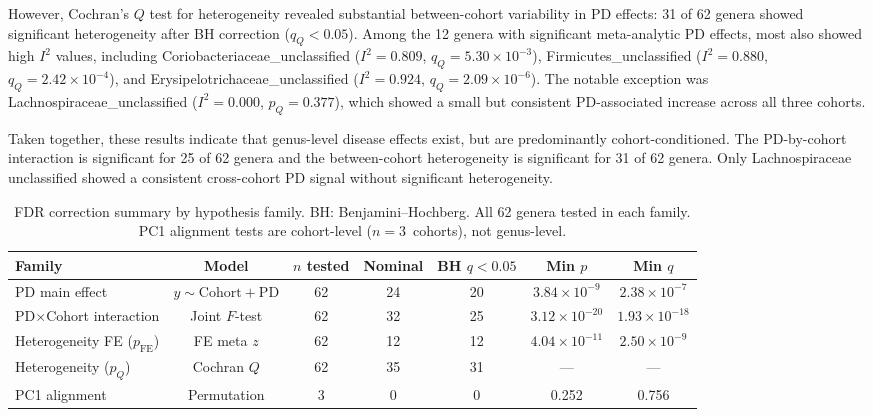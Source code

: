 \documentclass[12pt,a4paper]{article}
\begin{document}
However, Cochran's $Q$ test for heterogeneity revealed substantial
between-cohort variability in PD effects: 31 of 62 genera showed significant
heterogeneity after BH correction ($q_Q < 0.05$). Among the 12 genera with
significant meta-analytic PD effects, most also showed high $I^2$ values,
including Coriobacteriaceae\_unclassified ($I^2 = 0.809$,
$q_Q = 5.30 \times 10^{-3}$), Firmicutes\_unclassified ($I^2 = 0.880$,
$q_Q = 2.42 \times 10^{-4}$), and Erysipelotrichaceae\_unclassified
($I^2 = 0.924$, $q_Q = 2.09 \times 10^{-6}$). The notable exception was
Lachnospiraceae\_unclassified ($I^2 = 0.000$, $p_Q = 0.377$), which
showed a small but consistent PD-associated increase across all three
cohorts.

Taken together, these results indicate that genus-level disease effects
exist, but are predominantly cohort-conditioned. The PD-by-cohort
interaction is significant for 25 of 62 genera and the between-cohort
heterogeneity is significant for 31 of 62 genera. Only Lachnospiraceae
unclassified showed a consistent cross-cohort PD signal without significant
heterogeneity.

\begin{table}[h]
\centering
\caption{FDR correction summary by hypothesis family. BH: Benjamini--Hochberg.
All 62 genera tested in each family. PC1 alignment tests are cohort-level
($n = 3$~cohorts), not genus-level.}
\label{tab:fdr-summary}
\begin{tabular}{lcccccc}
\toprule
Family & Model & $n$ tested & Nominal & BH $q<0.05$ &
Min $p$ & Min $q$ \\
\midrule
PD main effect & $y \sim \mathrm{Cohort}+\mathrm{PD}$ &
  62 & 24 & 20 & $3.84\times10^{-9}$ & $2.38\times10^{-7}$ \\
PD$\times$Cohort interaction & Joint $F$-test &
  62 & 32 & 25 & $3.12\times10^{-20}$ & $1.93\times10^{-18}$ \\
Heterogeneity FE ($p_{\mathrm{FE}}$) & FE meta $z$ &
  62 & 12 & 12 & $4.04\times10^{-11}$ & $2.50\times10^{-9}$ \\
Heterogeneity ($p_Q$) & Cochran $Q$ &
  62 & 35 & 31 & --- & --- \\
PC1 alignment & Permutation & 3 & 0 & 0 & 0.252 & 0.756 \\
\bottomrule
\end{tabular}
\end{table}
\end{document}
